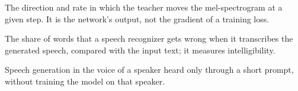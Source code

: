 \begin{description}[leftmargin=0pt,itemsep=2pt,font=\normalfont\itshape]
\item[Velocity.] The direction and rate in which the teacher moves the mel-spectrogram at a given step. It is the network's output, not the gradient of a training loss.
\item[Word error rate.] The share of words that a speech recognizer gets wrong when it transcribes the generated speech, compared with the input text; it measures intelligibility.
\item[Zero-shot TTS.] Speech generation in the voice of a speaker heard only through a short prompt, without training the model on that speaker.
\end{description}
\FloatBarrier
